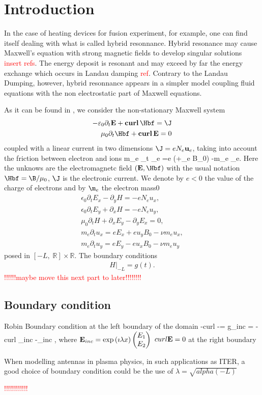 
\section{Introduction}
In the case of heating devices for fusion experiment, for example, 
 one can find itself dealing with what is called hybrid resonnance. 
 Hybrid resonance may cause Maxwell's equation with strong magnetic 
 fields to develop singular solutions \textcolor{red}{insert refs}. 
 The energy deposit is resonant and may exceed by far the energy 
 exchange which occurs in Landau damping \textcolor{red}{ref}. 
 Contrary to the Landau Dumping, however, 
 hybrid resonnance appears in a simpler model coupling 
 fluid equations with the non electrostatic part of Maxwell equations.
 
 
 As it can be found in \cite{stable_yee_plasma_current}, we consider the non-stationary Maxwell system  
 \begin{align}
-\varepsilon_0 \partial_t \E + \curl\, \Hbf = \J\\
\mu_0 \partial_t \Hbf + \curl\, \E = 0
\end{align}
coupled with a linear current in two dimensions $\J = eN_e \ubf_e$, taking into account the friction between electron and ions
\be
m_e \partial_t \ubf_e =e (\E +\ubf_e \nabla B_0) -m_e \nu \ubf_e. \label{eq:electronmove}
\ee
Here the unknows are the electromagnetc field $(\E,\Hbf)$ with the usual notation $\Hbf = \B/\mu_0$, $\J$ is the electronic current. We denote by $e<0$ the value of the charge of electrons and by $\m_e$ the electron mass0
\begin{align}
\epsilon_0\partial_t E_{x}-\partial_y H=-eN_e u_x,\nonumber\\
\epsilon_0\partial_t E_{y}+\partial_x H=-eN_e u_y,\nonumber\\
\mu_0\partial_t H+\partial_x E_y-\partial_y E_x=0,\\
m_e\partial_t u_x=eE_x+eu_yB_0-\nu m_e u_x,\nonumber\\
m_e\partial_t u_y=eE_y-eu_xB_0-\nu m_e u_y\nonumber
\end{align}
posed in $[-L,\; \mathbb{R}]\times \mathbb{R}$. The boundary conditions
\begin{align*}
H|_{-L}=g(t).
\end{align*}
\textcolor{red}{!!!!!!maybe move this next part to later!!!!!!!!}
\subsection{Boundary condition}
Robin Boundary condition at the left boundary of the domain
\be
-curl \E -\imath \lambda\E \wedge \n = g_{inc} = -curl \E_{inc} -\imath \lambda\E_{inc} \wedge \n,
\ee
where ${\bf E}_{inc} = \exp \left(\imath \lambda x\right)\begin{pmatrix} E_1\\ E_2 \end{pmatrix}$
$curl {\bf E} = 0$ at the right boundary
\begin{remark}
When modelling antennas in plasma physics, in such applications as ITER, a good choice of boundary condition could be the use of $\lambda = \sqrt{alpha(-L)}$
\end{remark}
\textcolor{red}{!!!!!!!!!!!!}